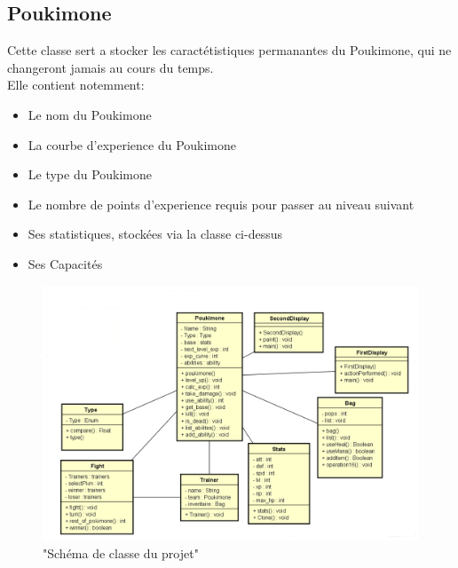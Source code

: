 \documentclass{report}
\begin{document}
\subsection*{Poukimone}
Cette classe sert a stocker les caractétistiques permanantes du Poukimone, qui ne changeront jamais au cours du temps.\\ 
Elle contient notemment:\\
\begin{itemize}
    \item{Le nom du Poukimone}
    \item{La courbe d'experience du Poukimone}
    \item{Le type du Poukimone}
    \item{Le nombre de points d'experience requis pour passer au niveau suivant}
    \item{Ses statistiques, stockées via la classe ci-dessus}
    \item{Ses Capacités}
\end{itemize}


\begin{figure}[ht!]
    \centering
    \includegraphics[width=125mm]{Q1.png}
    \caption{"Schéma de classe du projet"}
\end{figure}
\newpage
\end{document}
